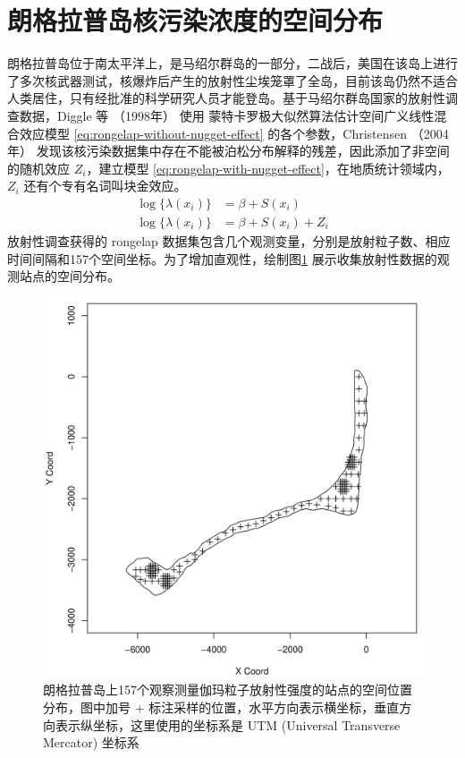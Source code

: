 \documentclass[12pt,a4paper,UTF8,twoside]{book}
\theoremstyle{definition}
\theoremstyle{definition}
\theoremstyle{definition}
\theoremstyle{remark}
\begin{document}
\hypertarget{case-rongelap}{%
\section{朗格拉普岛核污染浓度的空间分布}\label{case-rongelap}}

朗格拉普岛位于南太平洋上，是马绍尔群岛的一部分，二战后，美国在该岛上进行了多次核武器测试，核爆炸后产生的放射性尘埃笼罩了全岛，目前该岛仍然不适合人类居住，只有经批准的科学研究人员才能登岛。基于马绍尔群岛国家的放射性调查数据，Diggle
等 （1998年） \citep{Diggle1998} 使用
蒙特卡罗极大似然算法估计空间广义线性混合效应模型
\eqref{eq:rongelap-without-nugget-effect} 的各个参数，Christensen
（2004年） \citep{Christensen2004}
发现该核污染数据集中存在不能被泊松分布解释的残差，因此添加了非空间的随机效应
\(Z_i\)，建立模型
\eqref{eq:rongelap-with-nugget-effect}，在地质统计领域内，\(Z_i\)
还有个专有名词叫块金效应。 \begin{align}
\log\{\lambda(x_{i})\}& =  \beta + S(x_{i}) \label{eq:rongelap-without-nugget-effect}\\
\log\{\lambda(x_{i})\}& =  \beta + S(x_{i}) + Z_{i} \label{eq:rongelap-with-nugget-effect}
\end{align} 放射性调查获得的 rongelap
数据集包含几个观测变量，分别是放射粒子数、相应时间间隔和157个空间坐标。为了增加直观性，绘制图\ref{fig:rongelap-dataset}
展示收集放射性数据的观测站点的空间分布。

\begin{figure}

{\centering \includegraphics[width=0.65\linewidth]{figures/rongelap-island} 

}

\caption{朗格拉普岛上157个观察测量伽玛粒子放射性强度的站点的空间位置分布，图中加号 + 标注采样的位置，水平方向表示横坐标，垂直方向表示纵坐标，这里使用的坐标系是 UTM (Universal Transverse Mercator) 坐标系}\label{fig:rongelap-dataset}
\end{figure}
\end{document}
